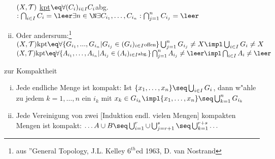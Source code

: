 \begin{bem}
\begin{enumerate}[(i)]
$(X,\mathcal T )$ \ul{kpt}$\eq \forall (C_i)_{i\in I} C_i $abg.$:\bigcap_{i\in I} C_i=\leer\exists n\in\N\exists C_{i_1},\dots ,C_{i_n}: \bigcap_{j=1}^nC_{i_j}=\leer$
\item Oder andersrum:\footnote{aus ''General Topology, J.L. Kelley $6^{th}$ed 1963, D. van Nostrand}\\
$(X,\T )\mbox{kpt}\eq\forall \{ G_{i_1},... ,G_{i_n}| G_{i_j}\in(G_i)_{i\in I} \mbox{\scriptsize offen}\} \bigcup_{j=1}^n G_{i_j}\neq X\impl \bigcup_{i\in I}G_i\neq X$\\
$(X,\T )\mbox{kpt}\eq\forall \{ A_{i_1},\dots ,A_{i_n}| A_{i_j}\in(A_i)_{i\in I} \mbox{\scriptsize abg.}\} \bigcap_{j=1}^n A_{i_j}\neq \leer\impl \bigcap_{i\in I}A_i\neq \leer$
\end{enumerate}
\end{bem}
\begin{beob} zur Kompaktheit
\begin{enumerate}[(i)]
\item Jede endliche Menge ist kompakt: Ist $\{x_1,\dots ,x_n\}\seq\bigcup_{i\in I}G_i$, dann w"ahle zu jedem $k=1,\dots ,n$ ein $i_k$ mit $x_k\in G_{i_k}\impl \{x_1,\dots ,x_n\}\seq\bigcup_{k=1}^nG_{i_k}$
\item Jede Vereinigung von zwei $[$Induktion endl. vielen Mengen$]$ kompakten Mengen ist kompakt: $\dots A\cup B\seq \bigcup_{i=1}^r \cup \bigcup_{j=r+1}^s\seq \bigcup_{k=1}^{r+s}\dots$
\end{enumerate}
\end{beob}

